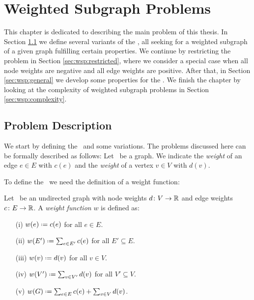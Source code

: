\section{Weighted Subgraph Problems}
\label{sec:wsp}

This chapter is dedicated to describing the main problem of this thesis. In Section \ref{sec:wsp:problem} we define several variants of the \WSP, all seeking for a weighted subgraph of a given graph fulfilling certain properties. We continue by restricting the problem in Section \ref{sec:wsp:restricted}, where we consider a special case when all node weights are negative and all edge weights are positive. After that, in Section \ref{sec:wsp:general} we develop some properties for the \WSP. We finish the chapter by looking at the complexity of weighted subgraph problems in Section \ref{sec:wsp:complexity}.

\subsection{Problem Description}
\label{sec:wsp:problem}

We start by defining the \WSP\ and some variations. The problems discussed here can be formally described as follows: Let \ugraph\ be a graph. We indicate the \textit{weight} of an edge $e \in E$ with $c(e)$ and the \textit{weight} of a vertex $v \in V$ with $d(v)$.\medskip

To define the \WSP\ we need the definition of a weight function:

\begin{definition}
	\label{def:weightfunction}
	Let \ugraph\ be an undirected graph with node weights $d \colon V \to \mathbb{R}$ and edge weights $c \colon E \to \mathbb{R}$. A \textit{weight function} $w$ is defined as:
	\begin{itemize}
		\item[(i)] $w(e) \defeq c(e)$ for all $e\in E$.
		\item[(ii)] $w(E') \defeq \sum_{e\in E'} c(e)$ for all $E' \subseteq E$.
		\item[(iii)] $w(v) \defeq d(v)$ for all $v\in V$.
		\item[(iv)] $w(V') \defeq \sum_{v\in V'} d(v)$ for all $V' \subseteq V$.
		\item[(v)] $w(G) \defeq \sum_{e\in E} c(e) + \sum_{v\in V} d(v)$.
	\end{itemize}
\end{definition}

